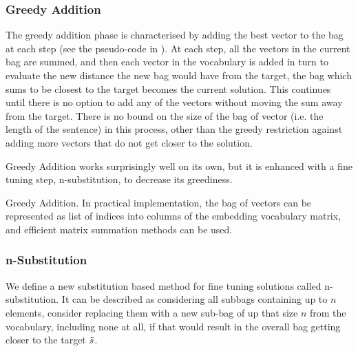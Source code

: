 \documentclass{book}
\begin{document}
\subsubsection{Greedy Addition}
The greedy addition phase is characterised by adding the best vector to the bag at each step (see the pseudo-code in ). At each step, all the vectors in the current bag are summed, and then each vector in the vocabulary is added in turn to evaluate the new distance the new bag would have from the target, the bag which sums to be closest to the target  becomes the current solution. This continues until there is no option to add any of the vectors without moving the sum away from the target. There is no bound on the size of the bag of vector (i.e. the length of the sentence) in this process, other than the greedy restriction against adding more vectors that do not get closer to the solution.

Greedy Addition works surprisingly well on its own, but it is enhanced with a fine tuning step, n-substitution, to decrease its greediness.

\begin{algorithm}
	\SetAlgoLined
\caption{Greedy Addition. In practical implementation, the bag of vectors can be represented as list of indices into columns of the embedding vocabulary matrix, and efficient matrix summation methods can be used.}
\label{pseudocode:greedyaddition}
\end{algorithm}


\subsubsection{n-Substitution}
We define a new substitution based method for fine tuning solutions called n-substitution. It can be described as considering all subbags containing up to $n$ elements, consider replacing them with a new sub-bag of up that size $n$ from the vocabulary, including none at all, if that would result in the overall bag getting closer to the target $\tilde{s}$. 
\end{document}
